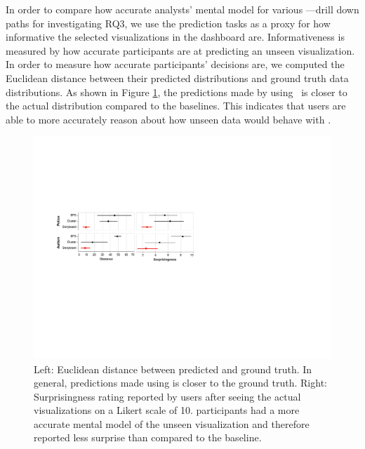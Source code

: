  In order to compare how accurate analysts' mental model for various ---drill down paths for investigating RQ3, we use the prediction tasks as a proxy for how informative the selected visualizations in the dashboard are. Informativeness is measured by how accurate participants are at predicting an unseen visualization. In order to measure how accurate participants' decisions are, we computed the Euclidean distance between their predicted distributions and ground truth data distributions. As shown in Figure \ref{fig:distance}, the predictions made by using \system\ is closer to the actual distribution compared to the baselines. This indicates that users are able to more accurately reason about how unseen data would behave with \system. 
\begin{figure}[h!]
\centering
\includegraphics[width=\linewidth]{figures/prediction_surprisingness_distance.pdf}
\caption{Left: Euclidean distance between predicted and ground truth. In general, predictions made using \system is closer to the ground truth. Right: Surprisingness rating reported by users after seeing the actual visualizations on a Likert scale of 10. \system participants had a more accurate mental model of the unseen visualization and therefore reported less surprise than compared to the baseline.}
\label{fig:distance}
\end{figure}
